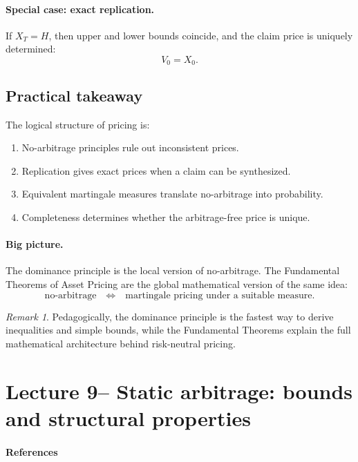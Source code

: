\documentclass[11pt]{article}
\newcommand{\1}{\mathbf{1}}
\theoremstyle{plain}
\theoremstyle{definition}
\theoremstyle{remark}
\newtheorem{remark}[theorem]{Remark}
\begin{document}
\paragraph{Special case: exact replication.}
If \(X_T=H\), then upper and lower bounds coincide, and the claim price is uniquely determined:
\[
V_0=X_0.
\]

\subsection{Practical takeaway}

The logical structure of pricing is:

\begin{enumerate}
    \item No-arbitrage principles rule out inconsistent prices.
    \item Replication gives exact prices when a claim can be synthesized.
    \item Equivalent martingale measures translate no-arbitrage into probability.
    \item Completeness determines whether the arbitrage-free price is unique.
\end{enumerate}

\paragraph{Big picture.}
The dominance principle is the local version of no-arbitrage.
The Fundamental Theorems of Asset Pricing are the global mathematical version of the same idea:
\[
\text{no-arbitrage}
\quad\Longleftrightarrow\quad
\text{martingale pricing under a suitable measure.}
\]

\begin{remark}
Pedagogically, the dominance principle is the fastest way to derive inequalities and simple bounds,
while the Fundamental Theorems explain the full mathematical architecture behind risk-neutral pricing.
\end{remark}



\section{Lecture 9-- Static arbitrage: bounds and structural properties}


\paragraph{References}
\end{document}
